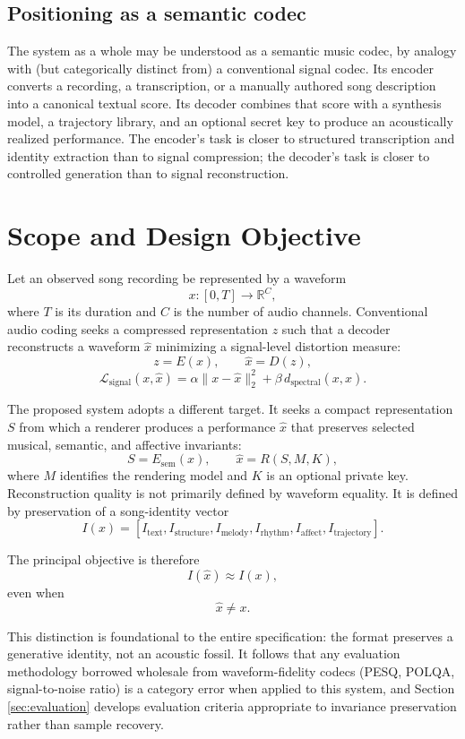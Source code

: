 \documentclass[11pt]{article}
\newcommand{\R}{\mathbb{R}}
\begin{document}
\subsection{Positioning as a semantic codec}

The system as a whole may be understood as a semantic music codec, by analogy with (but categorically distinct from) a conventional signal codec. Its encoder converts a recording, a transcription, or a manually authored song description into a canonical textual score. Its decoder combines that score with a synthesis model, a trajectory library, and an optional secret key to produce an acoustically realized performance. The encoder's task is closer to structured transcription and identity extraction than to signal compression; the decoder's task is closer to controlled generation than to signal reconstruction.

\section{Scope and Design Objective}

Let an observed song recording be represented by a waveform
\[
x:[0,T]\rightarrow \R^{C},
\]
where $T$ is its duration and $C$ is the number of audio channels. Conventional audio coding seeks a compressed representation $z$ such that a decoder reconstructs a waveform $\hat{x}$ minimizing a signal-level distortion measure:
\[
z=E(x), \qquad \hat{x}=D(z),
\]
\[
\mathcal{L}_{\mathrm{signal}}(x,\hat{x})
=
\alpha\|x-\hat{x}\|_2^2
+
\beta\,d_{\mathrm{spectral}}(x,\hat{x}).
\]

The proposed system adopts a different target. It seeks a compact representation $S$ from which a renderer produces a performance $\hat{x}$ that preserves selected musical, semantic, and affective invariants:
\[
S=E_{\mathrm{sem}}(x),
\qquad
\hat{x}=R(S,M,K),
\]
where $M$ identifies the rendering model and $K$ is an optional private key. Reconstruction quality is not primarily defined by waveform equality. It is defined by preservation of a song-identity vector
\[
I(x)=
\left[
I_{\mathrm{text}},
I_{\mathrm{structure}},
I_{\mathrm{melody}},
I_{\mathrm{rhythm}},
I_{\mathrm{affect}},
I_{\mathrm{trajectory}}
\right].
\]

The principal objective is therefore
\[
I(\hat{x})\approx I(x),
\]
even when
\[
\hat{x}\neq x.
\]

This distinction is foundational to the entire specification: the format preserves a generative identity, not an acoustic fossil. It follows that any evaluation methodology borrowed wholesale from waveform-fidelity codecs (PESQ, POLQA, signal-to-noise ratio) is a category error when applied to this system, and Section \ref{sec:evaluation} develops evaluation criteria appropriate to invariance preservation rather than sample recovery.
\end{document}
